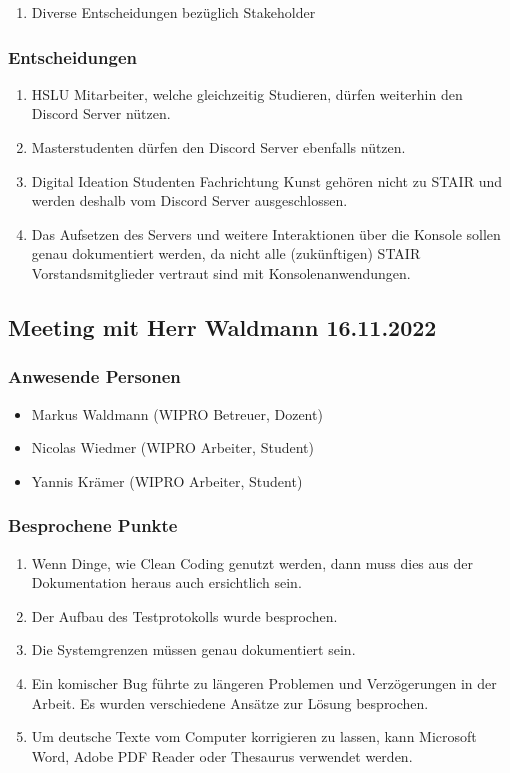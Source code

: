 \documentclass[a4paper, table]{article}
\begin{document}
\begin{enumerate}
    \item Diverse Entscheidungen bezüglich Stakeholder
\end{enumerate}

\subsubsection*{Entscheidungen}

\begin{enumerate}
    \item HSLU Mitarbeiter, welche gleichzeitig Studieren, dürfen weiterhin den Discord Server nützen.
    \item Masterstudenten dürfen den Discord Server ebenfalls nützen.
    \item Digital Ideation Studenten Fachrichtung Kunst gehören nicht zu STAIR und werden deshalb vom Discord Server ausgeschlossen.
    \item Das Aufsetzen des Servers und weitere Interaktionen über die Konsole sollen genau dokumentiert werden, da nicht alle (zukünftigen) STAIR Vorstandsmitglieder vertraut sind mit Konsolenanwendungen.
\end{enumerate}

\newpage
\subsection{Meeting mit Herr Waldmann 16.11.2022}

\subsubsection*{Anwesende Personen}

\begin{itemize}
    \item Markus Waldmann (WIPRO Betreuer, Dozent)
    \item Nicolas Wiedmer (WIPRO Arbeiter, Student)
    \item Yannis Krämer (WIPRO Arbeiter, Student)
\end{itemize}

\subsubsection*{Besprochene Punkte}

\begin{enumerate}
    \item Wenn Dinge, wie Clean Coding genutzt werden, dann muss dies aus der Dokumentation heraus auch ersichtlich sein.
    \item Der Aufbau des Testprotokolls wurde besprochen.
    \item Die Systemgrenzen müssen genau dokumentiert sein.
    \item Ein komischer Bug führte zu längeren Problemen und Verzögerungen in der Arbeit. Es wurden verschiedene Ansätze zur Lösung besprochen.
    \item Um deutsche Texte vom Computer korrigieren zu lassen, kann Microsoft Word, Adobe PDF Reader oder Thesaurus verwendet werden.
\end{enumerate}
\end{document}
